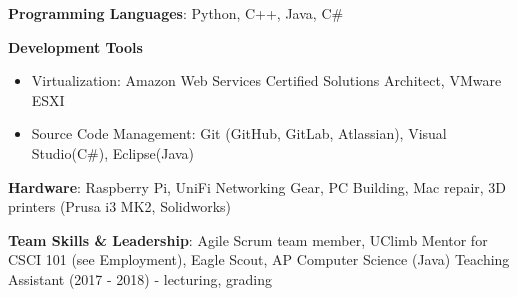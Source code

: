 \vspace{-2.0mm}


\begin{cventries}
\vspace{-5mm}
  \cventry
    {}
    {}
    {}
    {}
    {
      \begin{cvitems}
        \item {\textbf{Programming Languages}: Python, C++, Java, C\#}
        \item {\textbf{Development Tools}}
        \begin{itemize}
        \item {Virtualization: Amazon Web Services
            Certified Solutions Architect, VMware ESXI}
        \item {Source Code Management: Git (GitHub, GitLab, Atlassian),
            Visual Studio(C\#), Eclipse(Java)}
        \end {itemize}
        \item {\textbf{Hardware}: Raspberry Pi, UniFi Networking Gear,
            PC Building, Mac repair, 3D printers (Prusa i3 MK2,
            Solidworks)}
        \item {\textbf{Team Skills \& Leadership}: Agile Scrum team
            member, UClimb Mentor for CSCI 101 (see Employment), Eagle Scout, AP Computer Science (Java) Teaching
            Assistant (2017 - 2018) - lecturing, grading }
      \end{cvitems}
    }
\end{cventries}
